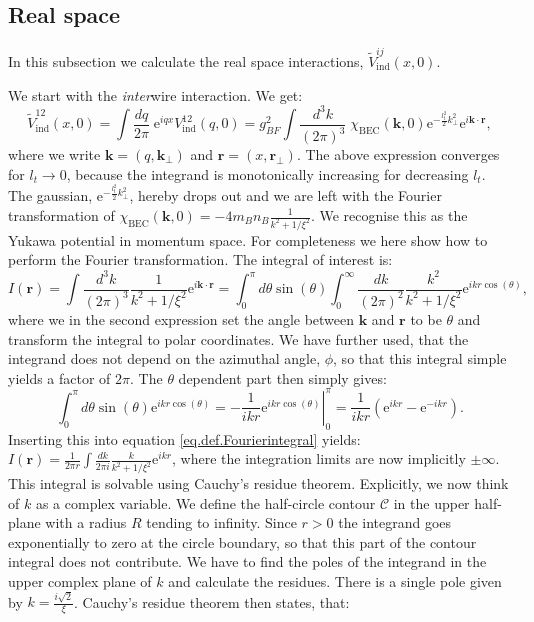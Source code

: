 \subsection{Real space}
\label{subsec.inducedinteraction.realspace}
In this subsection we calculate the real space interactions, $\tilde{V}^{ij}_{\text{ind}}(x, 0)$. 

We start with the \textit{inter}wire interaction. We get:
\begin{equation}
\tilde{V}^{12}_{\text{ind}}(x, 0) = \int \frac{dq}{2\pi} \; \text{e}^{iqx} V^{12}_{\text{ind}}(q, 0) = g^2_{BF}\int \frac{d^3 k}{(2\pi)^3}\;\chi_\text{BEC}(\mathbf{k}, 0)\text{e}^{-\frac{l_t^2}{2}k_\perp^2}\text{e}^{i\mathbf{k}\cdot \mathbf{r}}, \nonumber
\end{equation}
where we write $\mathbf{k} = (q, \mathbf{k}_{\perp})$ and $\mathbf{r} = (x, \mathbf{r}_{\perp})$. The above expression converges for $l_t \to 0$, because the integrand is monotonically increasing for decreasing $l_t$. The gaussian, $\text{e}^{-\frac{l_t^2}{2}k_\perp^2}$, hereby drops out and we are left with the Fourier transformation of $\chi_\text{BEC}(\mathbf{k}, 0) = -4m_Bn_B\frac{1}{k^2 + 1/\xi^2}$. We recognise this as the Yukawa potential in momentum space. For completeness we here show how to perform the Fourier transformation. The integral of interest is:
\begin{equation}
I(\mathbf{r}) = \int \frac{d^3 k}{(2\pi)^3} \frac{1}{k^2 + 1/\xi^2}\text{e}^{i\mathbf{k}\cdot\mathbf{r}} = \int_{0}^{\pi}d\theta \sin(\theta)\int_{0}^{\infty}\frac{dk}{(2\pi)^2} \frac{k^2}{k^2 + 1/\xi^2}\text{e}^{ikr\cos(\theta)},
\label{eq.def.Fourierintegral}
\end{equation}
where we in the second expression set the angle between $\mathbf{k}$ and $\mathbf{r}$ to be $\theta$ and transform the integral to polar coordinates. We have further used, that the integrand does not depend on the azimuthal angle, $\phi$, so that this integral simple yields a factor of $2\pi$. The $\theta$ dependent part then simply gives:
\begin{equation}
\int_{0}^{\pi}d\theta \sin(\theta)\text{e}^{ikr\cos(\theta)} = -\left.\frac{1}{ikr}\text{e}^{ikr\cos(\theta)}\right|_{0}^{\pi} = \frac{1}{ikr}\left(\text{e}^{ikr} - \text{e}^{-ikr}\right). \nonumber
\end{equation}
Inserting this into equation \eqref{eq.def.Fourierintegral} yields: $I(\mathbf{r}) = \frac{1}{2\pi r}\int \frac{dk}{2\pi i} \frac{k}{k^2 + 1/\xi^2}\text{e}^{ikr}$, where the integration limits are now implicitly $\pm \infty$. This integral is solvable using Cauchy's residue theorem. Explicitly, we now think of $k$ as a complex variable. We define the half-circle contour $\mathcal{C}$ in the upper half-plane with a radius $R$ tending to infinity. Since $r > 0$ the integrand goes exponentially to zero at the circle boundary, so that this part of the contour integral does not contribute. We have to find the poles of the integrand in the upper complex plane of $k$ and calculate the residues. There is a single pole given by $k = \frac{i\sqrt{2}}{\xi}$. Cauchy's residue theorem then states, that:
